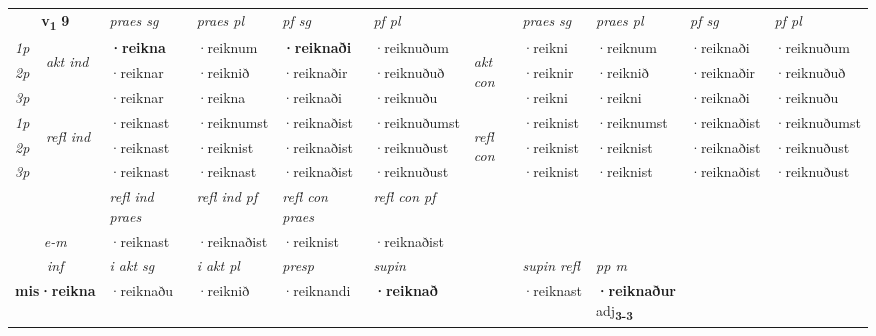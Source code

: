 \noindent
\begin{tabular}{lllllllllll} \toprule
\multicolumn{2}{c}{\textbf{v{\textsubscript{1}}} \Large{\textbf{9}}}  &  \textit{praes sg}  & \textit{praes pl}  &\textit{ pf sg} & \textit{pf pl} &  &  \textit{praes sg}  & \textit{praes pl}  & \textit{pf sg} & \textit{pf pl } \\*
	\cmidrule{3-6} \cmidrule{8-11}
 {\textit{1p}} & \multirow{3}{*}{\begin{turn}{90}\textit{akt ind}\end{turn}} & \textbf{·reikna} & ·reiknum & \textbf{·reiknaði} & ·reiknuðum & \multirow{3}{*}{\begin{turn}{90}\textit{akt con}\end{turn}} &·reikni & ·reiknum & ·reiknaði & ·reiknuðum\\*
 {\textit{2p}} &  &  ·reiknar  & ·reiknið & ·reiknaðir & ·reiknuðuð & & ·reiknir & ·reiknið & ·reiknaðir & ·reiknuðuð \\*
{\textit{3p}} &  & ·reiknar & ·reikna & ·reiknaði & ·reiknuðu & & ·reikni & ·reikni& ·reiknaði & ·reiknuðu \\*
\cmidrule{3-6} \cmidrule{8-11}
 {\textit{1p}} & \multirow{3}{*}{\begin{turn}{90}\textit{refl ind}\end{turn}}  & ·reiknast & ·reiknumst & ·reiknaðist & ·reiknuðumst & \multirow{3}{*}{\begin{turn}{90}\textit{refl con}\end{turn}}  &·reiknist & ·reiknumst & ·reiknaðist & ·reiknuðumst \\*
 {\textit{2p}} &  & ·reiknast & ·reiknist & ·reiknaðist & ·reiknuðust & &·reiknist & ·reiknist & ·reiknaðist & ·reiknuðust \\*
 {\textit{3p}}  & & ·reiknast & ·reiknast & ·reiknaðist & ·reiknuðust & & ·reiknist & ·reiknist& ·reiknaðist & ·reiknuðust \\*
\cmidrule{3-6} \cmidrule{8-11}

 & & \textit{refl ind praes} & \textit{refl ind pf} & \textit{refl con praes} & \textit{refl con pf} \\*
 \multicolumn{2}{c}{ \textit{e-m} }& ·reiknast & ·reiknaðist & ·reiknist & ·reiknaðist \\*

\cmidrule{3-9}
   \multicolumn{2}{c}{\textit{inf}}  & \textit{i akt sg} & \textit{i akt pl}   & \textit{presp} & \textit{supin} && \textit{supin refl} & \textit{pp m} \\*
  \multicolumn{2}{c}{\textbf{mis\allowbreak ·reikna}} & ·reiknaðu  & ·reiknið   & ·reiknandi &  \textbf{·reiknað} && ·reiknast & \specialcell{\textbf{·reiknaður} \\ adj\textbf{\textsubscript{3-3}}} \\*
\end{tabular}

